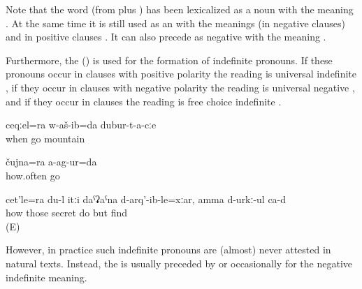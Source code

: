 Note that the word  (from   plus ) has been lexicalized as a noun with the meaning . At the same time it is still used as an  with the meanings  (in negative clauses) and  in positive clauses . It can also precede  as negative  with the meaning .

Furthermore, the   () is used for the formation of indefinite pronouns. If these pronouns occur in clauses with positive polarity the reading is universal indefinite , if they occur in clauses with negative polarity the reading is universal negative , and if they occur in  clauses the reading is free choice indefinite .

\begin{exe}
	\ex	\label{ex:I always went through the mountains}
	\gll	ceqːel=ra	w-aš-ib=da	dubur-t-a-cːe\\
		when	go	mountain\\
	\glt	{}

	\ex	\label{ex:I did not go even once.1}
	\gll	čujna=ra	a-ag-ur=da\\
		how.often	go\\
	\glt	{}

	\ex	\label{ex:However I hide them, (they always) find them}
	\gll	cet'le=ra	du-l	itːi	daˁʡaˁna	d-arq'-ib-le=xːar, amma d-urkː-ul ca-d\\
		how		those	secret	do	but	find \\
	\glt	{} (E)
\end{exe}

However, in practice such indefinite pronouns are (almost) never attested in natural texts. Instead, the   is usually preceded by   or occasionally   for the negative indefinite meaning.

